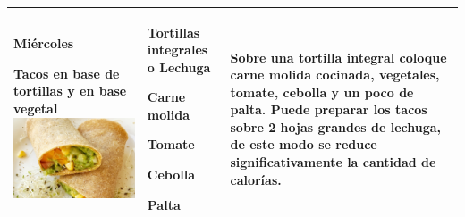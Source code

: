 \documentclass[menu.tex]{subfiles}
\begin{document}
\begin{tabular} {p{3.5cm} p{4cm} p{9cm}}
\pbox{20cm}
{
\rule{0pt}{3ex}\begin{large}\textbf{Miércoles}\end{large}\\
\rule{0pt}{2ex}Tacos en base de \\ tortillas y en base \\ vegetal \\ \includegraphics[scale=0.17]{tacos-integrales}
}&
\vspace{-2cm}
\begin{compactitem} 
\begin{footnotesize}
\item Tortillas integrales o Lechuga
\item Carne molida
\item Tomate
\item Cebolla
\item Palta
\end{footnotesize}
\end{compactitem}&
\vspace{-2cm}
Sobre una tortilla integral coloque carne molida cocinada, vegetales, tomate, cebolla y un poco de palta. Puede preparar los tacos sobre 2 hojas grandes de lechuga, de este modo se reduce significativamente la cantidad de calorías.\\
\hline


\end{tabular}
\end{document}
